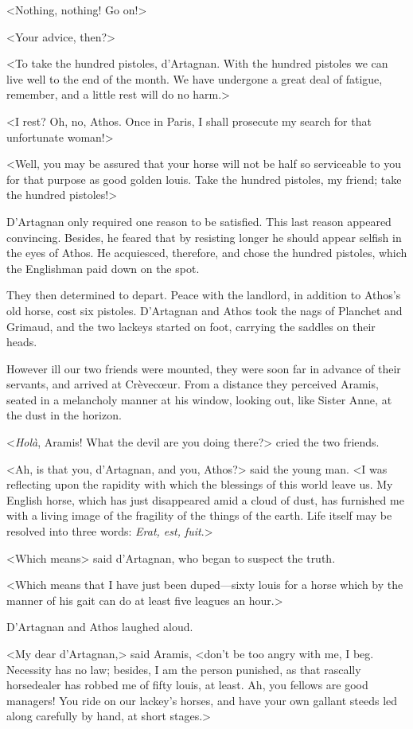 <Nothing, nothing! Go on!> 

<Your advice, then?> 

<To take the hundred pistoles, d'Artagnan. With the hundred pistoles we can live well to the end of the month. We have undergone a great deal of fatigue, remember, and a little rest will do no harm.> 

<I rest? Oh, no, Athos. Once in Paris, I shall prosecute my search for that unfortunate woman!> 

<Well, you may be assured that your horse will not be half so serviceable to you for that purpose as good golden louis. Take the hundred pistoles, my friend; take the hundred pistoles!> 

D'Artagnan only required one reason to be satisfied. This last reason appeared convincing. Besides, he feared that by resisting longer he should appear selfish in the eyes of Athos. He acquiesced, therefore, and chose the hundred pistoles, which the Englishman paid down on the spot. 

They then determined to depart. Peace with the landlord, in addition to Athos's old horse, cost six pistoles. D'Artagnan and Athos took the nags of Planchet and Grimaud, and the two lackeys started on foot, carrying the saddles on their heads. 

However ill our two friends were mounted, they were soon far in advance of their servants, and arrived at Crèvecœur. From a distance they perceived Aramis, seated in a melancholy manner at his window, looking out, like Sister Anne, at the dust in the horizon. 

<\textit{Holà}, Aramis! What the devil are you doing there?> cried the two friends. 

<Ah, is that you, d'Artagnan, and you, Athos?> said the young man. <I was reflecting upon the rapidity with which the blessings of this world leave us. My English horse, which has just disappeared amid a cloud of dust, has furnished me with a living image of the fragility of the things of the earth. Life itself may be resolved into three words: \textit{Erat, est, fuit}.> 

<Which means\longdash> said d'Artagnan, who began to suspect the truth. 

<Which means that I have just been duped---sixty louis for a horse which by the manner of his gait can do at least five leagues an hour.> 

D'Artagnan and Athos laughed aloud. 

<My dear d'Artagnan,> said Aramis, <don't be too angry with me, I beg. Necessity has no law; besides, I am the person punished, as that rascally horsedealer has robbed me of fifty louis, at least. Ah, you fellows are good managers! You ride on our lackey's horses, and have your own gallant steeds led along carefully by hand, at short stages.> 

